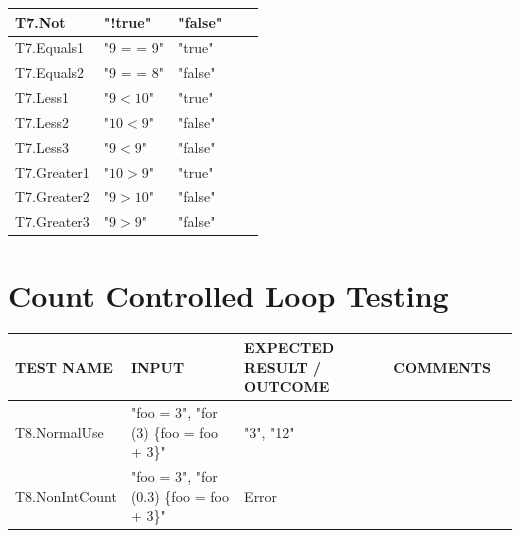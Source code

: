 \documentclass[a4paper, oneside, 11pt]{report}
\begin{document}
\begin{tabular}{|p{1.5in}|p{1.5in}|p{1.6in}|p{1.6in}|p{2.4in}|}
        \hline
        T7.Not                            & "!true"                                 & "false"       &                \\
        \hline
        T7.Equals1                        & "9 = = 9"                                & "true"        &                \\
        \hline
        T7.Equals2                        & "9 = = 8"                                & "false"       &                \\
        \hline
        T7.Less1                          & "$9 < 10$"                                 & "true"        &                \\
        \hline
        T7.Less2                          & "$10 < 9$"                                 & "false"       &                \\
        \hline
        T7.Less3                          & "$9 < 9$"                                  & "false"       &                \\
        \hline
        T7.Greater1                       & "$10 > 9$"                                 & "true"        &                \\
        \hline
        T7.Greater2                       & "$9 > 10$"                                 & "false"       &                \\
        \hline
        T7.Greater3                       & "$9 > 9$"                                  & "false"       &                \\
        \hline
    \end{tabular}
    \section{Count Controlled Loop Testing}
    \label{LoopTest}
    \begin{tabular}{|p{1.5in}|p{1.5in}|p{1.6in}|p{1.6in}|p{2.4in}|}
        \hline
        TEST NAME       & INPUT                     & EXPECTED RESULT / OUTCOME              & COMMENTS                                \\
        \hline
        T8.NormalUse                     & "foo = 3", "for (3) \{foo = foo + 3\}"   & "3", "12"       &                \\
        \hline
        T8.NonIntCount                   & "foo = 3", "for (0.3) \{foo = foo + 3\}" & Error         &                \\
        \hline
    \end{tabular}
\end{document}
